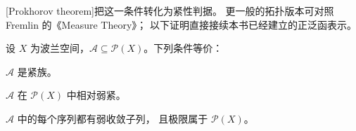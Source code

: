\ProseParagraphBreak

[Prokhorov theorem]把这一条件转化为紧性判据。
更一般的拓扑版本可对照 Fremlin 的《Measure Theory》\cite[437N--P and 437U--V]{Fremlin2016Measure}；
以下证明直接接续本书已经建立的正泛函表示。

\begin{theorem}[Prokhorov]\label{b1:thm:prokhorov}
设 \(X\) 为波兰空间，\(\mathcal A\subseteq\mathcal P(X)\)。下列条件等价：
\begin{equivalences}
\item\label{b1:item:prokhorov-tight}\(\mathcal A\) 是紧族。
\item\label{b1:item:prokhorov-compact}\(\mathcal A\) 在 \(\mathcal P(X)\) 中相对弱紧。
\item\label{b1:item:prokhorov-sequence}\(\mathcal A\) 中的每个序列都有弱收敛子列，
且极限属于 \(\mathcal P(X)\)。
\end{equivalences}
\end{theorem}
